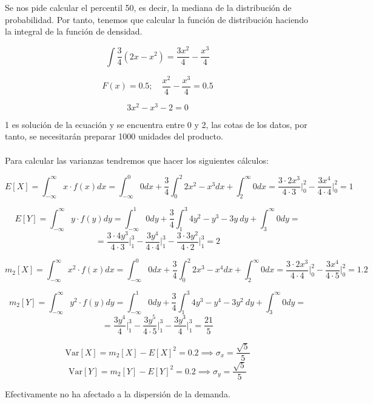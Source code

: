 \problem \\
\subproblem \\
Se nos pide calcular el percentil 50, es decir, la mediana de la distribución de probabilidad. Por tanto, tenemos que calcular la función de distribución haciendo la integral de la función de densidad.

$$\int \dfrac{3}{4}(2x-x^2) = \dfrac{3x^2}{4} - \dfrac{x^3}{4}$$

$$F(x) = 0.5;\quad \dfrac{x^2}{4} - \dfrac{x^3}{4} = 0.5$$

$$3x^2 - x^3 - 2 = 0$$

1 es solución de la ecuación y se encuentra entre 0 y 2, las cotas de los datos, por tanto, se necesitarán preparar 1000 unidades del producto.\\

\subproblem \\
Para calcular las varianzas tendremos que hacer los siguientes cálculos:

$$E[X] = \int_{-\infty}^{\infty} x\cdot f(x)dx = \int_{-\infty}^0 0dx + \dfrac{3}{4} \int_0^2 2x^2 - x^3dx + \int_2^{\infty} 0dx = \dfrac{3\cdot2x^3}{4\cdot3} \biggr\rvert_0^2 - \dfrac{3x^4}{4\cdot4}\biggr\rvert_0^2 = 1$$

$$E[Y] = \int_{-\infty}^{\infty} y\cdot f(y)dy = \int_{-\infty}^1 0dy + \dfrac{3}{4} \int_1^3 4y^2 - y^3 -3y\ dy + \int_3^{\infty} 0dy = $$ 
$$= \dfrac{3\cdot4y^3}{4\cdot3} \biggr\rvert_1^3 - \dfrac{3y^4}{4\cdot4}\biggr\rvert_1^3 - \dfrac{3\cdot3y^2}{4\cdot2}\biggr\rvert_1^3= 2$$


$$m_2[X] = \int_{-\infty}^{\infty} x^2\cdot f(x)dx = \int_{-\infty}^0 0dx + \dfrac{3}{4} \int_0^2 2x^3 - x^4dx + \int_2^{\infty} 0dx = \dfrac{3\cdot2x^3}{4\cdot4} \biggr\rvert_0^2 - \dfrac{3x^4}{4\cdot5}\biggr\rvert_0^2 = 1.2$$

$$m_2[Y] = \int_{-\infty}^{\infty} y^2\cdot f(y)dy = \int_{-\infty}^1 0dy + \dfrac{3}{4} \int_1^3 4y^3 - y^4 -3y^2\ dy + \int_3^{\infty} 0dy = $$ 
$$= \dfrac{3y^4}{4} \biggr\rvert_1^3 - \dfrac{3y^5}{4\cdot5}\biggr\rvert_1^3 - \dfrac{3y^3}{4}\biggr\rvert_1^3= \dfrac{21}{5}$$

$$\mbox{Var}[X] = m_2[X] - E[X]^2 = 0.2 \implies \sigma_x = \dfrac{\sqrt{5}}{5}$$
$$\mbox{Var}[Y] = m_2[Y] - E[Y]^2 = 0.2 \implies \sigma_y = \dfrac{\sqrt{5}}{5}$$

Efectivamente no ha afectado a la dispersión de la demanda.
